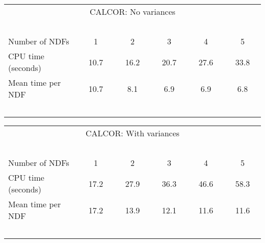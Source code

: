 \begin{center}
   \begin{tabular}{|l||c|c|c|c|c|}
   \multicolumn{6}{c}{CALCOR: No variances} \\
   \multicolumn{6}{l}{~~~}
   \\ \hline
   Number of NDFs    & ~~~1~~~ & ~~~2~~~ & ~~~3~~~ & ~~~4~~~ & ~~~5~~~
    \\ \hline
   CPU time (seconds)&  10.7   & 16.2   & 20.7   & 27.6   & 33.8
    \\ \hline
   Mean time per NDF & 10.7    & 8.1    & 6.9    &  6.9     & 6.8
    \\ \hline
   \multicolumn{6}{l}{~~~}
   \\
   \end{tabular}
   \begin{tabular}{|l||c|c|c|c|c|}
   \multicolumn{6}{c}{CALCOR: With variances} \\
   \multicolumn{6}{l}{~~~}
   \\ \hline
   Number of NDFs    & ~~~1~~~ & ~~~2~~~ & ~~~3~~~ & ~~~4~~~ & ~~~5~~~
    \\ \hline
   CPU time (seconds)&  17.2   & 27.9   & 36.3   & 46.6   & 58.3
    \\ \hline
   Mean time per NDF &  17.2   & 13.9   & 12.1    & 11.6     & 11.6
    \\ \hline
   \multicolumn{6}{l}{~~~}
   \\
   \end{tabular}
\end{center}


